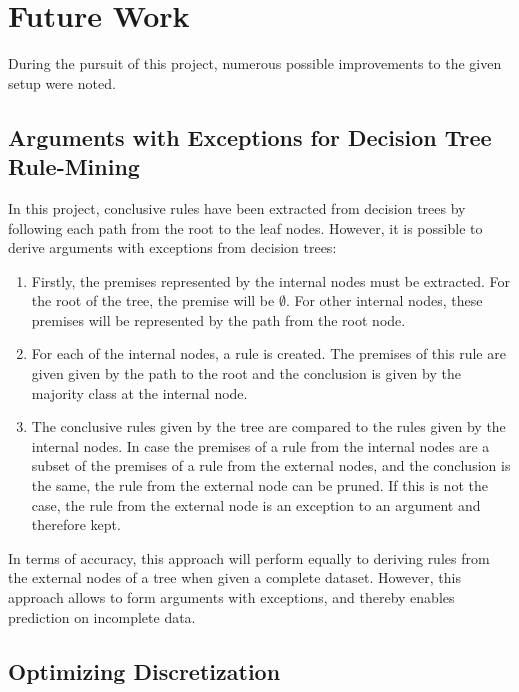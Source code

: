 \label{fw}
\section{Future Work}

During the pursuit of this project, numerous possible improvements to the given setup were noted.

\subsection*{Arguments with Exceptions for Decision Tree Rule-Mining}

In this project, conclusive rules have been extracted from decision trees by following each path from the root to the leaf nodes. However, it is possible to derive arguments with exceptions from decision trees:

\begin{enumerate}
    \item Firstly, the premises represented by the internal nodes must be extracted. For the root of the tree, the premise will be $\emptyset$. For other internal nodes, these premises will be represented by the path from the root node.
    \item For each of the internal nodes, a rule is created. The premises of this rule are given given by the path to the root and the conclusion is given by the majority class at the internal node.
    \item The conclusive rules given by the tree are compared to the rules given by the internal nodes. In case the premises of a rule from the internal nodes are a subset of the premises of a rule from the external nodes, and the conclusion is the same, the rule from the external node can be pruned. If this is not the case, the rule from the external node is an exception to an argument and therefore kept.
\end{enumerate}

In terms of accuracy, this approach will perform equally to deriving rules from the external nodes of a tree when given a complete dataset. However, this approach allows to form arguments with exceptions, and thereby enables prediction on incomplete data.

\subsection*{Optimizing Discretization}

